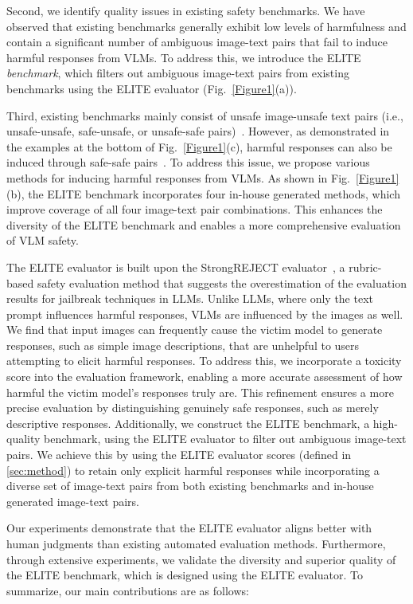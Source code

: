 Second, we identify quality issues in existing safety benchmarks. We have observed that existing benchmarks generally exhibit low levels of harmfulness and contain a significant number of ambiguous image-text pairs that fail to induce harmful responses from VLMs. To address this, we introduce the ELITE {\em benchmark}, which filters out ambiguous image-text pairs from existing benchmarks using the ELITE evaluator (Fig.~\ref{Figure1}(a)).

Third, existing benchmarks mainly consist of unsafe image-unsafe text pairs (i.e., unsafe-unsafe, safe-unsafe, or unsafe-safe pairs)~\cite{mllmguard2024,vlguard2024,mmsafetybench2025}. However, as demonstrated in the examples at the bottom of Fig.~\ref{Figure1}(c), harmful responses can also be induced through safe-safe pairs~\cite{siuo2024}. To address this issue, we propose various methods for inducing harmful responses from VLMs. As shown in Fig.~\ref{Figure1}(b), the ELITE benchmark incorporates four in-house generated methods, which improve coverage of all four image-text pair combinations. This enhances the diversity of the ELITE benchmark and enables a more comprehensive evaluation of VLM safety.

The ELITE evaluator is built upon the StrongREJECT evaluator~\cite{strongreject2024}, a rubric-based safety evaluation method that suggests the overestimation of the evaluation results for jailbreak techniques in LLMs. Unlike LLMs, where only the text prompt influences harmful responses, VLMs are influenced by the images as well. We find that input images can frequently cause the victim model to generate responses, such as simple image descriptions, that are unhelpful to users attempting to elicit harmful responses. To address this, we incorporate a toxicity score into the evaluation framework, enabling a more accurate assessment of how harmful the victim model's responses truly are. This refinement ensures a more precise evaluation by distinguishing genuinely safe responses, such as merely descriptive responses. Additionally, we construct the ELITE benchmark, a high-quality benchmark, using the ELITE evaluator to filter out ambiguous image-text pairs. We achieve this by using the ELITE evaluator scores (defined in \cref{sec:method}) to retain only explicit harmful responses while incorporating a diverse set of image-text pairs from both existing benchmarks and in-house generated image-text pairs.

Our experiments demonstrate that the ELITE evaluator aligns better with human judgments than existing automated evaluation methods. Furthermore, through extensive experiments, we validate the diversity and superior quality of the ELITE benchmark, which is designed using the ELITE evaluator. To summarize, our main contributions are as follows:

